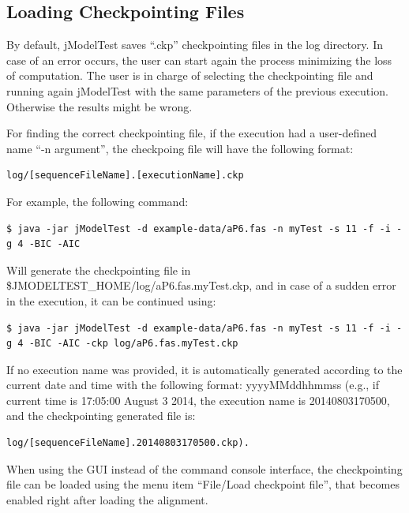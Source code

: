 \documentclass[11pt,twoside,a4paper]{article}
\begin{document}
\subsection{Loading Checkpointing Files}
\label{sec:ckp}

By default, jModelTest saves ``.ckp'' checkpointing files in the log directory. In case of an error occurs, the user can start again the process minimizing the loss of computation. The user is in charge of selecting the checkpointing file and running again jModelTest with the same parameters of the previous execution. Otherwise the results might be wrong.

For finding the correct checkpointing file, if the execution had a user-defined name ``-n argument'', the checkpoing file will have the following format: 

\begin{lstlisting}
log/[sequenceFileName].[executionName].ckp
\end{lstlisting}

For example, the following command:

\begin{lstlisting}
$ java -jar jModelTest -d example-data/aP6.fas -n myTest -s 11 -f -i -g 4 -BIC -AIC
\end{lstlisting}

Will generate the checkpointing file in \$JMODELTEST\_HOME/log/aP6.fas.myTest.ckp, and in case of a sudden error in the execution, it can be continued using:

\begin{lstlisting}
$ java -jar jModelTest -d example-data/aP6.fas -n myTest -s 11 -f -i -g 4 -BIC -AIC -ckp log/aP6.fas.myTest.ckp
\end{lstlisting}

If no execution name was provided, it is automatically generated according to the current date and time with the following format: yyyyMMddhhmmss (e.g., if current time is 17:05:00 August 3 2014, the execution name is 20140803170500, and the checkpointing generated file is:

\begin{lstlisting}
log/[sequenceFileName].20140803170500.ckp).
\end{lstlisting}

When using the GUI instead of the command console interface, the checkpointing file can be loaded using the menu item ``File/Load checkpoint file'', that becomes enabled right after loading the alignment.
\end{document}
